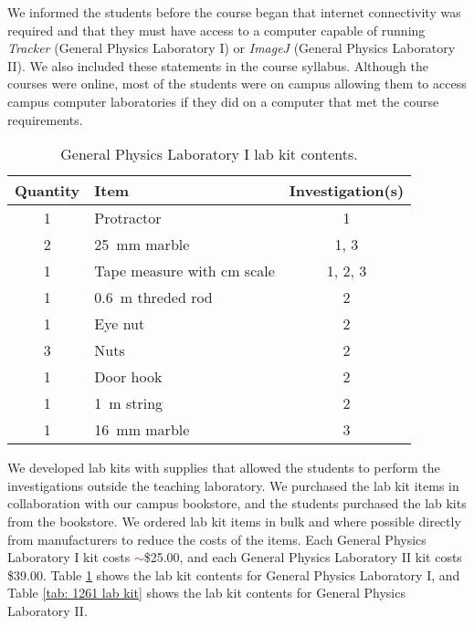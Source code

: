 \documentclass[aip, numerical, preprint]{revtex4-2}
\begin{document}
We informed the students before the course began that internet connectivity was required and
that they must have access to a computer capable of running \emph{Tracker} (General Physics
Laboratory I) or \emph{ImageJ} (General Physics Laboratory II). We also included these
statements in the course syllabus. Although the courses were online, most of the students were
on campus allowing them to access campus computer laboratories if they did on a computer that
met the course requirements.
  
\begin{table}
  \caption{\label{tab: 1251 lab kit} General Physics Laboratory I lab kit contents.}
  \begin{tabular}{clc}
    \hline\hline
    Quantity & Item & Investigation(s)\\
    \hline
    1 & Protractor & 1 \\
    2 & \SI{25}{mm} marble & 1, 3 \\
    1 & Tape measure with cm scale & 1, 2, 3\\
    1 & \SI{0.6}{m} threded rod & 2 \\
    1 & Eye nut & 2 \\
    3 & Nuts & 2 \\
    1 & Door hook & 2 \\
    1 & \SI{1}{m} string & 2 \\
    1 & \SI{16}{mm} marble & 3 \\
    \hline\hline
  \end{tabular}
\end{table}

We developed lab kits with supplies that allowed the students to perform the investigations
outside the teaching laboratory. We purchased the lab kit items in collaboration with our
campus bookstore, and the students purchased the lab kits from the bookstore. We ordered lab
kit items in bulk and where possible directly from manufacturers to reduce the costs of the
items. Each General Physics Laboratory I kit costs \textcolor{red}{$\sim$}\$25.00, and each
General Physics Laboratory II kit costs \$39.00. Table \ref{tab: 1251 lab kit} shows the lab
kit contents for General Physics Laboratory I, and Table \ref{tab: 1261 lab kit} shows the lab
kit contents for General Physics Laboratory II.
\end{document}
